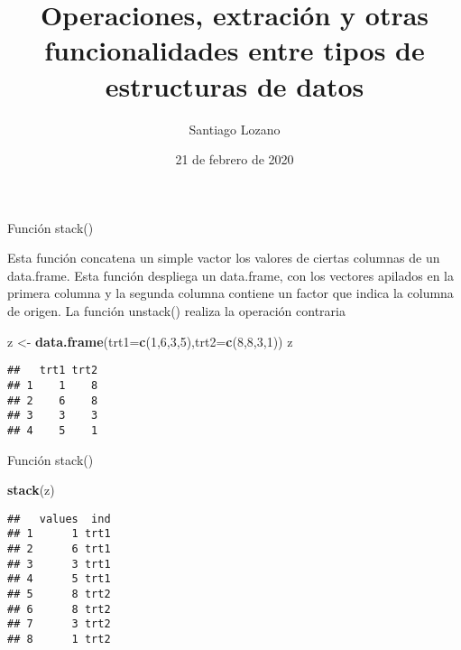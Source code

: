 \documentclass[ignorenonframetext,]{beamer}
\title{Operaciones, extración y otras funcionalidades entre tipos de
estructuras de datos}
\author{Santiago Lozano}
\date{21 de febrero de 2020}
\newenvironment{Shaded}{\begin{snugshade}}{\end{snugshade}}
\newcommand{\KeywordTok}[1]{\textcolor[rgb]{0.13,0.29,0.53}{\textbf{#1}}}
\newcommand{\DataTypeTok}[1]{\textcolor[rgb]{0.13,0.29,0.53}{#1}}
\newcommand{\DecValTok}[1]{\textcolor[rgb]{0.00,0.00,0.81}{#1}}
\newcommand{\StringTok}[1]{\textcolor[rgb]{0.31,0.60,0.02}{#1}}
\newcommand{\NormalTok}[1]{#1}
\begin{document}
\frame{\titlepage}

\begin{frame}[fragile]{Función stack()}

Esta función concatena un simple vactor los valores de ciertas columnas
de un data.frame. Esta función despliega un data.frame, con los vectores
apilados en la primera columna y la segunda columna contiene un factor
que indica la columna de origen. La función unstack() realiza la
operación contraria 

\begin{Shaded}
\begin{Highlighting}[]
\NormalTok{z <-}\StringTok{ }\KeywordTok{data.frame}\NormalTok{(}\DataTypeTok{trt1=}\KeywordTok{c}\NormalTok{(}\DecValTok{1}\NormalTok{,}\DecValTok{6}\NormalTok{,}\DecValTok{3}\NormalTok{,}\DecValTok{5}\NormalTok{),}\DataTypeTok{trt2=}\KeywordTok{c}\NormalTok{(}\DecValTok{8}\NormalTok{,}\DecValTok{8}\NormalTok{,}\DecValTok{3}\NormalTok{,}\DecValTok{1}\NormalTok{))}
\NormalTok{z}
\end{Highlighting}
\end{Shaded}

\begin{verbatim}
##   trt1 trt2
## 1    1    8
## 2    6    8
## 3    3    3
## 4    5    1
\end{verbatim}

\end{frame}

\begin{frame}[fragile]{Función stack()}

\begin{Shaded}
\begin{Highlighting}[]
\KeywordTok{stack}\NormalTok{(z)}
\end{Highlighting}
\end{Shaded}

\begin{verbatim}
##   values  ind
## 1      1 trt1
## 2      6 trt1
## 3      3 trt1
## 4      5 trt1
## 5      8 trt2
## 6      8 trt2
## 7      3 trt2
## 8      1 trt2
\end{verbatim}

\end{frame}
\end{document}

